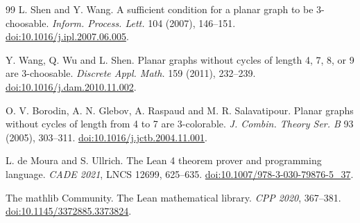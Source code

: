 \documentclass[11pt]{article}
\begin{document}
\begin{thebibliography}{99}
 L. Shen and Y. Wang.
A sufficient condition for a planar graph to be 3-choosable.
\emph{Inform. Process. Lett.} 104 (2007), 146--151.
\href{https://doi.org/10.1016/j.ipl.2007.06.005}{doi:10.1016/j.ipl.2007.06.005}.

 Y. Wang, Q. Wu and L. Shen.
Planar graphs without cycles of length 4, 7, 8, or 9 are 3-choosable.
\emph{Discrete Appl. Math.} 159 (2011), 232--239.
\href{https://doi.org/10.1016/j.dam.2010.11.002}{doi:10.1016/j.dam.2010.11.002}.

 O. V. Borodin, A. N. Glebov, A. Raspaud and M. R. Salavatipour.
Planar graphs without cycles of length from 4 to 7 are 3-colorable.
\emph{J. Combin. Theory Ser. B} 93 (2005), 303--311.
\href{https://doi.org/10.1016/j.jctb.2004.11.001}{doi:10.1016/j.jctb.2004.11.001}.

 L. de Moura and S. Ullrich.
The Lean 4 theorem prover and programming language.
\emph{CADE 2021}, LNCS 12699, 625--635.
\href{https://doi.org/10.1007/978-3-030-79876-5_37}{doi:10.1007/978-3-030-79876-5\_37}.

 The mathlib Community.
The Lean mathematical library.
\emph{CPP 2020}, 367--381.
\href{https://doi.org/10.1145/3372885.3373824}{doi:10.1145/3372885.3373824}.

\end{thebibliography}
\end{document}
